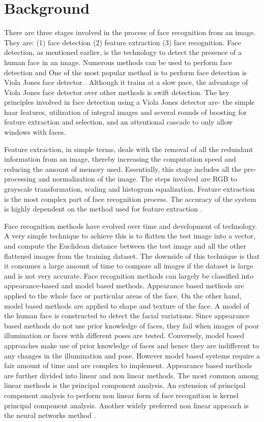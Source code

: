 \documentclass[conference]{IEEEtran}
\begin{document}
\section{Background}
\label{sec: 2.Background}

There are three stages involved in the process of face recognition from an image. They are: (1) face detection (2) feature extraction (3) face recognition. Face detection, as mentioned earlier, is the technology to detect the presence of a human face in an image. Numerous methods can be used to perform face detection and One of the most popular method is to perform face detection is Viola Jones face detector \cite{zafeiriou2015survey}. Although it trains at a slow pace, the advantage of Viola Jones face detector over other methods is swift detection. The key principles involved in face detection using a Viola Jones detector are- the simple haar features, utilization of integral images and several rounds of boosting for feature extraction and selection, and an attentional cascade to only allow windows with faces\cite{zafeiriou2015survey}.

Feature extraction, in simple terms, deals with the removal of all the redundant information from an image, thereby increasing the computation speed and reducing the amount of memory used. Essentially, this stage includes all the pre-processing and normalization of the image. The steps involved are RGB to grayscale transformation, scaling and histogram equalization. Feature extraction is the most complex part of face recognition process. The accuracy of the system is highly dependent on the method used for feature extraction \cite{brunelli1993face}.

Face recognition methods have evolved over time and development of technology. A very simple technique to achieve this is to flatten the test image into a vector, and compute the Euclidean distance between the test image and all the other flattened images from the training dataset. The downside of this technique is that it consumes a large amount of time to compare all images if the dataset is large and is not very accurate. Face recognition methods can largely be classified into appearance-based and model based methods. Appearance based methods are applied to the whole face or particular areas of the face. On the other hand, model based methods are applied to shape and texture of the face. A model of the human face is constructed to detect the facial variations. Since appearance based methods do not use prior knowledge of faces, they fail when images of poor illumination or faces with different poses are tested. Conversely, model based approaches  make use of prior knowledge of faces and hence they are indifferent to any changes in the illumination and pose. However model based systems require a fair amount of time and are complex to implement. Appearance based methods are further divided into linear and non linear methods. The most common among linear methods is the principal component analysis. An extension of principal component analysis to perform non linear form of face recognition is kernel principal component analysis. Another widely preferred non linear approach is the neural networks method \cite{agrawal2015evaluation}.
\end{document}
